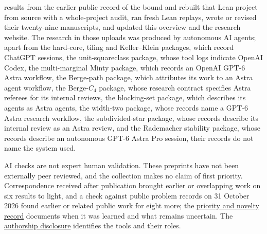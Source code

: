 \documentclass[11pt,a4paper]{article}
\begin{document}
results from the earlier public record of the bound and rebuilt that Lean project from source with a whole-project audit, ran fresh Lean replays, wrote or revised their twenty-nine manuscripts, and updated this overview and the research website. The research in those uploads was produced by autonomous AI agents; apart from the hard-core, tiling and Keller--Klein packages, which record ChatGPT sessions, the unit-squareclass package, whose tool logs indicate OpenAI Codex, the multi-marginal Minty package, which records an OpenAI GPT-6 Astra workflow, the Berge-path package, which attributes its work to an Astra agent workflow, the Berge-$C_4$ package, whose research contract specifies Astra referees for its internal reviews, the blocking-set package, which describes its agents as Astra agents, the width-two package, whose records name a GPT-6 Astra research workflow, the subdivided-star package, whose records describe its internal review as an Astra review, and the Rademacher stability package, whose records describe an autonomous GPT-6 Astra Pro session, their records do not name the system used.

AI checks are not expert human validation. These preprints have not been externally peer reviewed, and the collection makes no claim of first priority. Correspondence received after publication brought earlier or overlapping work on six results to light, and a check against public problem records on 31 October 2026 found earlier or related public work for eight more; the \href{https://github.com/dvgyl/math-and-theory/blob/main/PRIORITY_AND_NOVELTY.md}{priority and novelty record} documents when it was learned and what remains uncertain. The \href{https://github.com/dvgyl/math-and-theory/blob/main/AUTHORSHIP.md}{authorship disclosure} identifies the tools and their roles.

\begin{abstract}

The catalogue contains sixty-one manuscripts and research notes across 60 result families in mathematics, theoretical computer science, and mathematical physics. Each paper states its formal verification scope. The thermal proof covers finite spectral statements, without a formal stochastic long-time identification theorem. The Gyires preprint proves inequalities for structured matrices and develops related polynomial bounds. Its principal order-five and order-six claims, the all-order permutation-polynomial and four-block theorems, and the exceptional-vector theorem have complete Lean proofs. The results comprise counterexamples, exact special cases, sharp sequence bounds, and convergence thresholds for optimization methods. The collection makes no claim of first priority. The papers have not been peer reviewed.

\end{abstract}
\end{document}
